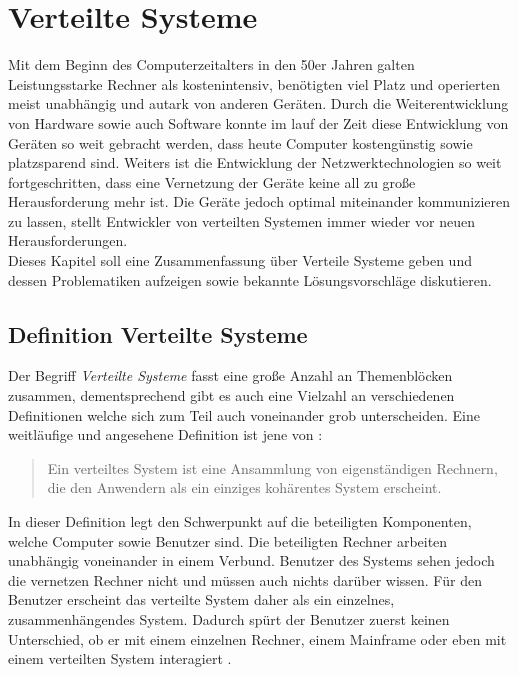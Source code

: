 \chapter{Verteilte Systeme}\label{cha:distributedSystems}
Mit dem Beginn des Computerzeitalters in den 50er Jahren galten Leistungsstarke Rechner als kostenintensiv, benötigten viel Platz und operierten meist unabhängig und autark von anderen Geräten. Durch die Weiterentwicklung von Hardware sowie auch Software konnte im lauf der Zeit diese Entwicklung von Geräten so weit gebracht werden, dass heute Computer kostengünstig sowie platzsparend sind. Weiters ist die Entwicklung der Netzwerktechnologien so weit fortgeschritten, dass eine Vernetzung der Geräte keine all zu große Herausforderung mehr ist. Die Geräte jedoch optimal miteinander kommunizieren zu lassen, stellt Entwickler von verteilten Systemen immer wieder vor neuen Herausforderungen. \citep{tanenbaum2007distributed} \\
Dieses Kapitel soll eine Zusammenfassung über Verteile Systeme geben und dessen Problematiken aufzeigen sowie  bekannte Lösungsvorschläge diskutieren.

\section{Definition Verteilte Systeme}\label{sec:distributedSystems:definition}
Der Begriff \textit{Verteilte Systeme} fasst eine große Anzahl an Themenblöcken zusammen, dementsprechend gibt es auch eine Vielzahl an verschiedenen Definitionen welche sich zum Teil auch voneinander grob unterscheiden. Eine weitläufige und angesehene Definition ist jene von \cite{tanenbaum2007distributed}:
\begin{quote}
    Ein verteiltes System ist eine Ansammlung von eigenständigen Rechnern, die den Anwendern als ein einziges kohärentes System erscheint.
    \label{quote:distributedSystem:tanenbaum}
\end{quote}
In dieser Definition legt \cite{tanenbaum2007distributed} den Schwerpunkt auf die beteiligten Komponenten, welche Computer sowie Benutzer sind. Die beteiligten Rechner arbeiten unabhängig voneinander in einem Verbund. Benutzer des Systems sehen jedoch die vernetzen Rechner nicht und müssen auch nichts darüber wissen. Für den Benutzer erscheint das verteilte System daher als ein einzelnes, zusammenhängendes System. Dadurch spürt der Benutzer zuerst keinen Unterschied, ob er mit einem einzelnen Rechner, einem Mainframe oder eben mit einem verteilten System interagiert \citep{tanenbaum2007distributed}. \\

